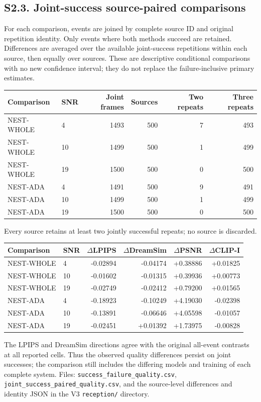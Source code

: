 \clearpage\subsection*{S2.3. Joint-success source-paired comparisons}
For each comparison, events are joined by complete source ID and original repetition identity. Only events where both methods succeed are retained. Differences are averaged over the available joint-success repetitions within each source, then equally over sources. These are descriptive conditional comparisons with no new confidence interval; they do not replace the failure-inclusive primary estimates.
\begin{center}\small\begin{tabular}{llrrrr}\toprule Comparison & SNR & Joint frames & Sources & Two repeats & Three repeats\\\midrule
NEST-WHOLE & 4 & 1493 & 500 & 7 & 493\\
NEST-WHOLE & 10 & 1499 & 500 & 1 & 499\\
NEST-WHOLE & 19 & 1500 & 500 & 0 & 500\\
NEST-ADA & 4 & 1491 & 500 & 9 & 491\\
NEST-ADA & 10 & 1499 & 500 & 1 & 499\\
NEST-ADA & 19 & 1500 & 500 & 0 & 500\\
\bottomrule\end{tabular}\end{center}
Every source retains at least two jointly successful repeats; no source is discarded.
\begin{center}\small\begin{tabular}{llrrrr}\toprule Comparison & SNR & $\Delta$LPIPS & $\Delta$DreamSim & $\Delta$PSNR & $\Delta$CLIP-I\\\midrule
NEST-WHOLE & 4 & -0.02894 & -0.04174 & +0.38886 & +0.01825\\
NEST-WHOLE & 10 & -0.01602 & -0.01315 & +0.39936 & +0.00773\\
NEST-WHOLE & 19 & -0.02749 & -0.02412 & +0.79200 & +0.01565\\
NEST-ADA & 4 & -0.18923 & -0.10249 & +4.19030 & -0.02398\\
NEST-ADA & 10 & -0.13891 & -0.06646 & +4.05598 & -0.01057\\
NEST-ADA & 19 & -0.02451 & +0.01392 & +1.73975 & -0.00828\\
\bottomrule\end{tabular}\end{center}
The LPIPS and DreamSim directions agree with the original all-event contrasts at all reported cells. Thus the observed quality differences persist on joint successes; the comparison still includes the differing models and training of each complete system. Files: \texttt{success\_failure\_quality.csv}, \texttt{joint\_success\_paired\_quality.csv}, and the source-level differences and identity JSON in the V3 \texttt{reception/} directory.
